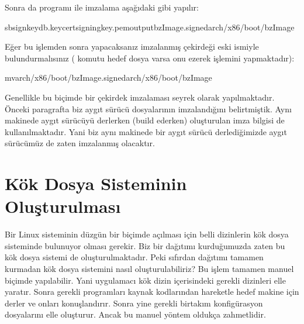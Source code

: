 \documentclass[a4paper,10pt,turkish]{sphinxmanual}
\begin{document}
\sphinxAtStartPar
Sonra da  programı ile imzalama aşağıdaki gibi yapılır:

\begin{sphinxVerbatim}[commandchars=\\\{\}]
\PYGZdl{}sbsign\PYGZhy{}\PYGZhy{}keydb.key\PYGZhy{}\PYGZhy{}certsigning\PYGZus{}key.pem\PYGZhy{}\PYGZhy{}outputbzImage.signedarch/x86/boot/bzImage
\end{sphinxVerbatim}

\sphinxAtStartPar
Eğer bu işlemden sonra  yapacaksanız imzalanmış çekirdeği eski ismiyle bulundurmalısınız
( komutu hedef dosya varsa onu ezerek işlemini yapmaktadır):

\begin{sphinxVerbatim}[commandchars=\\\{\}]
\PYGZdl{}mvarch/x86/boot/bzImage.signedarch/x86/boot/bzImage
\end{sphinxVerbatim}

\sphinxAtStartPar
Genellikle bu biçimde bir çekirdek imzalaması seyrek olarak yapılmaktadır. Önceki paragrafta biz aygıt
sürücü dosyalarının imzalandığını belirtmiştik. Aynı makinede aygıt sürücüyü derlerken (build ederken)
oluşturulan imza bilgisi de kullanılmaktadır. Yani biz aynı makinede bir aygıt sürücü derlediğimizde
aygıt sürücümüz de zaten imzalanmış olacaktır.


\section{Kök Dosya Sisteminin Oluşturulması}
\label{\detokenize{kernelcompilation:kok-dosya-sisteminin-olusturulmasi}}
\sphinxAtStartPar
Bir Linux sisteminin düzgün bir biçimde açılması için belli dizinlerin kök dosya sisteminde bulunuyor
olması gerekir. Biz bir dağıtımı kurduğumuzda zaten bu kök dosya sistemi de oluşturulmaktadır. Peki
sıfırdan dağıtımı tamamen kurmadan kök dosya sistemini nasıl oluşturulabiliriz? Bu işlem tamamen manuel
biçimde yapılabilir. Yani uygulamacı kök dizin içerisindeki gerekli dizinleri elle yaratır. Sonra
gerekli programları kaynak kodlarından hareketle hedef makine için derler ve onları konuşlandırır. Sonra
yine gerekli birtakım konfigürasyon dosyalarını elle oluşturur. Ancak bu manuel yöntem oldukça zahmetlidir.
\end{document}
